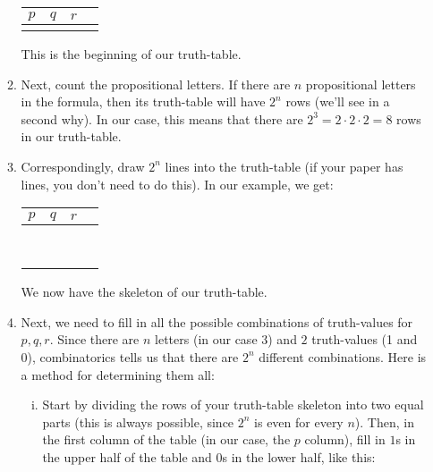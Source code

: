 \begin{enumerate}[\thesection.1]
\begin{enumerate}
\begin{center}
\begin{tabular}{c | c | c | c}
$p$ & $q$ & $r$ &\hspace{40ex} \\\hline
& & & \\

\end{tabular}
\end{center}

This is the beginning of our truth-table.

\item Next, count the propositional letters. If there are $n$ propositional letters in the formula, then its truth-table will have $2^n$ rows (we'll see in a second why). In our case, this means that there are $2^3=2\cdot 2\cdot 2=8$ rows in our truth-table.

\item Correspondingly, draw $2^n$ lines into the truth-table (if your paper has lines, you don't need to do this). In our example, we get:

\begin{center}
\begin{tabular}{c | c | c | c}
$p$ & $q$ & $r$ &\hspace*{40ex} \\\hline
& & & \\\hline
& & & \\\hline
& & & \\\hline
& & & \\\hline
& & & \\\hline
& & & \\\hline
& & & \\\hline
& & & \\

\end{tabular}
\end{center}

We now have the skeleton of our truth-table.

\item Next, we need to fill in all the possible combinations of truth-values for $p,q,r$. Since there are $n$ letters (in our case $3$) and $2$ truth-values (1 and 0), combinatorics tells us that there are $2^n$ different combinations. Here is a method for determining them all:

\begin{enumerate}[(i)]

\item Start by dividing the rows of your truth-table skeleton into two equal parts (this is always possible, since $2^n$ is even for every $n$). Then, in the first column of the table (in our case, the $p$ column), fill in $1$s in the upper half of the table and $0$s in the lower half, like this:


\end{enumerate}
\end{enumerate}
\end{enumerate}
